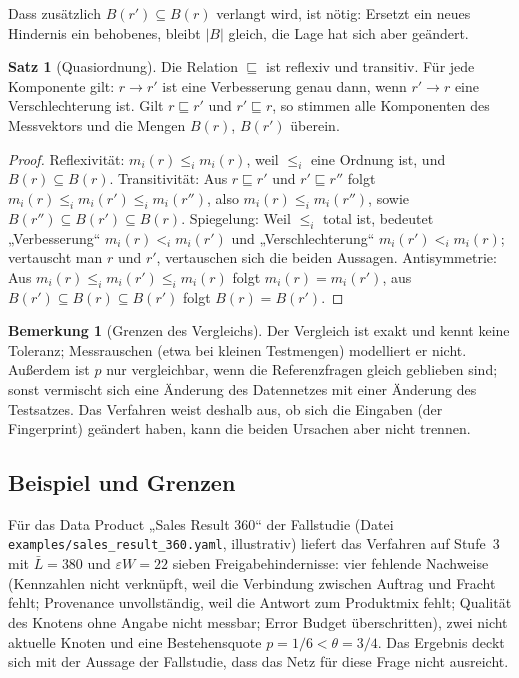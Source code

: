 \documentclass[a4paper,12pt]{article}
\theoremstyle{definition}
\newtheorem{bemerkung}[definition]{Bemerkung}
\newtheorem{satz}[definition]{Satz}
\begin{document}
Dass zusätzlich $B(r')\subseteq B(r)$ verlangt wird, ist nötig: Ersetzt ein neues Hindernis ein behobenes, bleibt $|B|$ gleich, die Lage hat sich aber geändert.

\begin{satz}[Quasiordnung]\label{thm:preorder}
Die Relation $\sqsubseteq$ ist reflexiv und transitiv. Für jede Komponente gilt: $r\to r'$ ist eine Verbesserung genau dann, wenn $r'\to r$ eine Verschlechterung ist. Gilt $r\sqsubseteq r'$ und $r'\sqsubseteq r$, so stimmen alle Komponenten des Messvektors und die Mengen $B(r)$, $B(r')$ überein.
\end{satz}
\begin{proof}
Reflexivität: $m_i(r)\le_i m_i(r)$, weil $\le_i$ eine Ordnung ist, und $B(r)\subseteq B(r)$. Transitivität: Aus $r\sqsubseteq r'$ und $r'\sqsubseteq r''$ folgt $m_i(r)\le_i m_i(r')\le_i m_i(r'')$, also $m_i(r)\le_i m_i(r'')$, sowie $B(r'')\subseteq B(r')\subseteq B(r)$. Spiegelung: Weil $\le_i$ total ist, bedeutet „Verbesserung“ $m_i(r)<_i m_i(r')$ und „Verschlechterung“ $m_i(r')<_i m_i(r)$; vertauscht man $r$ und $r'$, vertauschen sich die beiden Aussagen. Antisymmetrie: Aus $m_i(r)\le_i m_i(r')\le_i m_i(r)$ folgt $m_i(r)=m_i(r')$, aus $B(r')\subseteq B(r)\subseteq B(r')$ folgt $B(r)=B(r')$.
\end{proof}

\begin{bemerkung}[Grenzen des Vergleichs]
Der Vergleich ist exakt und kennt keine Toleranz; Messrauschen (etwa bei kleinen Testmengen) modelliert er nicht. Außerdem ist $p$ nur vergleichbar, wenn die Referenzfragen gleich geblieben sind; sonst vermischt sich eine Änderung des Datennetzes mit einer Änderung des Testsatzes. Das Verfahren weist deshalb aus, ob sich die Eingaben (der Fingerprint) geändert haben, kann die beiden Ursachen aber nicht trennen.
\end{bemerkung}

\subsection{Beispiel und Grenzen}

Für das Data Product „Sales Result 360“ der Fallstudie (Datei \texttt{examples/\allowbreak sales\_\allowbreak result\_\allowbreak 360.yaml}, illustrativ) liefert das Verfahren auf Stufe~3 mit $\bar L=380$ und $\varepsilon W=22$ sieben Freigabehindernisse: vier fehlende Nachweise (Kennzahlen nicht verknüpft, weil die Verbindung zwischen Auftrag und Fracht fehlt; Provenance unvollständig, weil die Antwort zum Produktmix fehlt; Qualität des Knotens ohne Angabe nicht messbar; Error Budget überschritten), zwei nicht aktuelle Knoten und eine Bestehensquote $p=1/6<\theta=3/4$. Das Ergebnis deckt sich mit der Aussage der Fallstudie, dass das Netz für diese Frage nicht ausreicht.
\end{document}
